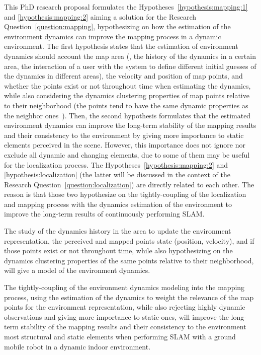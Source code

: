 This PhD research proposal formulates the Hypotheses~\ref{hypothesis:mapping:1} and \ref{hypothesis:mapping:2} aiming a solution for the Research Question~\ref{question:mapping}, hypothesizing on how the estimation of the environment dynamics can improve the mapping process in a dynamic environment.
The first hypothesis states that the estimation of environment dynamics should account the map area (\eg, the history of the dynamics in a certain area, the interaction of a user with the system to define different initial guesses of the dynamics in different areas), the velocity and position of map points, and whether the points exist or not throughout time when estimating the dynamics, while also considering the dynamics clustering properties of map points relative to their neighborhood (the points tend to have the same dynamic properties as the neighbor ones~\cite{du-et-al:2022:3028218}).
Then, the second hypothesis formulates that the estimated environment dynamics can improve the long-term stability of the mapping results and their consistency to the environment by giving more importance to static elements perceived in the scene. However, this importance does not ignore nor exclude all dynamic and changing elements, due to some of them may be useful for the localization process. The Hypotheses~\ref{hypothesis:mapping:2} and \ref{hypothesis:localization} (the latter will be discussed in the context of the Research Question~\ref{question:localization}) are directly related to each other. The reason is that those two hypothesize on the tightly-coupling of the localization and mapping process with the dynamics estimation of the environment to improve the long-term results of continuously performing \gls{SLAM}.

\begin{hypothesis}\label{hypothesis:mapping:1}
The study of the dynamics history in the area to update the environment representation, the perceived and mapped points state (position, velocity), and if those points exist or not throughout time, while also hypothesizing on the dynamics clustering properties of the same points relative to their neighborhood, will give a model of the environment dynamics.
\end{hypothesis}

\begin{hypothesis}\label{hypothesis:mapping:2}
The tightly-coupling of the environment dynamics modeling into the mapping process, using the estimation of the dynamics to weight the relevance of the map points for the environment representation, while also rejecting highly dynamic observations and giving more importance to static ones, will improve the long-term stability of the mapping results and their consistency to the environment most structural and static elements when performing \gls{SLAM} with a ground mobile robot in a dynamic indoor environment.
\end{hypothesis}




